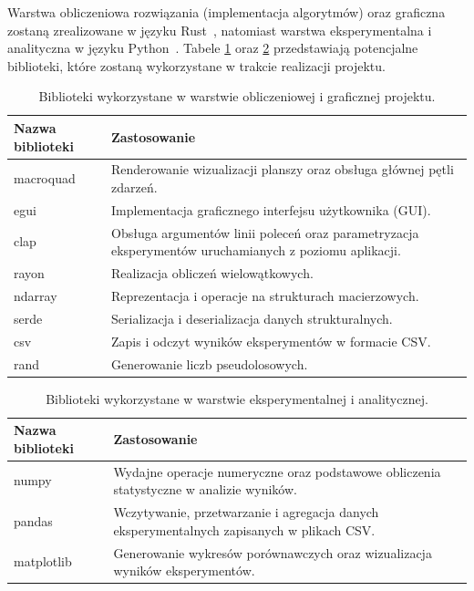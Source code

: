 \documentclass{article}
\begin{document}
Warstwa obliczeniowa rozwiązania (implementacja algorytmów) oraz graficzna zostaną zrealizowane w języku Rust~\cite{rust_lang}, natomiast warstwa eksperymentalna i analityczna w języku Python~\cite{python_lang}. Tabele \ref{tab:biblioteki_rust} oraz \ref{tab:biblioteki_python} przedstawiają potencjalne biblioteki, które zostaną wykorzystane w trakcie realizacji projektu.

\begin{table}[H]
\centering
\renewcommand{\arraystretch}{1.3}
\begin{tabularx}{\textwidth}{|p{4cm}|X|}
\hline
\textbf{Nazwa biblioteki} & \textbf{Zastosowanie} \\
\hline
macroquad
& Renderowanie wizualizacji planszy oraz obsługa głównej pętli zdarzeń. \\
\hline
egui
& Implementacja graficznego interfejsu użytkownika (GUI). \\
\hline
clap 
& Obsługa argumentów linii poleceń oraz parametryzacja eksperymentów uruchamianych z poziomu aplikacji. \\
\hline
rayon
& Realizacja obliczeń wielowątkowych. \\
\hline
ndarray 
& Reprezentacja i operacje na strukturach macierzowych. \\
\hline
serde 
& Serializacja i deserializacja danych strukturalnych. \\
\hline
csv 
& Zapis i odczyt wyników eksperymentów w formacie CSV. \\
\hline
rand
& Generowanie liczb pseudolosowych. \\
\hline
\end{tabularx}
\caption{Biblioteki wykorzystane w warstwie obliczeniowej i graficznej projektu.}
\label{tab:biblioteki_rust}
\end{table}

\begin{table}[H]
\centering
\renewcommand{\arraystretch}{1.3}
\begin{tabularx}{\textwidth}{|p{4cm}|X|}
\hline
\textbf{Nazwa biblioteki} & \textbf{Zastosowanie} \\
\hline
numpy 
& Wydajne operacje numeryczne oraz podstawowe obliczenia statystyczne w analizie wyników. \\
\hline
pandas 
& Wczytywanie, przetwarzanie i agregacja danych eksperymentalnych zapisanych w plikach CSV. \\
\hline
matplotlib 
& Generowanie wykresów porównawczych oraz wizualizacja wyników eksperymentów. \\
\hline
\end{tabularx}
\caption{Biblioteki wykorzystane w warstwie eksperymentalnej i analitycznej.}
\label{tab:biblioteki_python}
\end{table}
\end{document}
